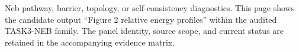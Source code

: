 Neb pathway, barrier, topology, or self-consistency diagnostics. This page shows the candidate output ``Figure 2 relative energy profiles'' within the audited TASK3-NEB family. The panel identity, source scope, and current status are retained in the accompanying evidence matrix.
